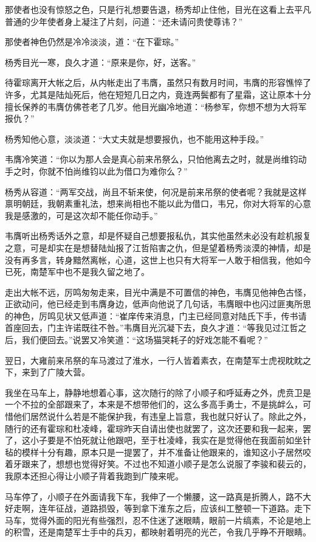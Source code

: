 那使者也没有惊怒之色，只是行礼想要告退，杨秀却止住他，目光在这看上去平凡普通的少年使者身上凝注了片刻，问道：“还未请问贵使尊讳？”

那使者神色仍然是冷冷淡淡，道：“在下霍琮。”

杨秀目光一寒，良久才道：“原来是你，好，送客。”

待霍琮离开大帐之后，从内帐走出了韦膺，虽然只有数月时间，韦膺的形容憔悴了许多，尤其是陆灿死后，他在短短几日之内，竟连两鬓都有了星霜，这让原本十分擅长保养的韦膺仿佛苍老了几岁。他目光幽冷地道：“杨参军，你想不想为大将军报仇？”

杨秀知他心意，淡淡道：“大丈夫就是想要报仇，也不能用这种手段。”

韦膺冷笑道：“你以为那人会是真心前来吊祭么，只怕他离去之时，就是尚维钧动手之时，你就不怕尚维钧以此为借口为难你么？”

杨秀从容道：“两军交战，尚且不斩来使，何况是前来吊祭的使者呢？我就是这样禀明朝廷，我朝素重礼法，想来尚相也不能以此为借口，韦兄，你对大将军的心意我是感激的，可是这次却不能任你动手。”

韦膺听出杨秀话外之意，却是怀疑自己想要报私仇，其实他虽然未必没有趁机报复之意，可是却实在是想替陆灿报了江哲陷害之仇，但是望着杨秀淡漠的神情，却是没有再多言，转身黯然离帐，心道，这世上也只有大将军一人敢于相信我，他如今已死，南楚军中也不是我久留之地了。

走出大帐不远，厉鸣匆匆走来，目光中满是不可置信的神色，韦膺见他神色古怪，正欲动问，他已经走到韦膺身边，低声向他说了几句话，韦膺眼中也闪过匪夷所思的神色，厉鸣见状又低声道：“崔庠传来消息，门主已经同意对陆氏下手，传书请首座回去，门主许诺既往不咎。”韦膺目光沉凝下去，良久才道：“等我见过江哲之后，我们便回去。”说罢又冷笑道：“这场猫哭耗子的好戏怎能不看呢？”

翌日，大雍前来吊祭的车马渡过了淮水，一行人皆着素衣，在南楚军士虎视眈眈之下，来到了广陵大营。

我坐在马车上，静静地想着心事，这次随行的除了小顺子和呼延寿之外，虎贲卫是一个不拉的全部跟来了，本来是不想带他们的，这么多高手勇士，不是挑衅么，可惜他们居然说什么若是不能保护我，有违皇上旨意，我也就只好认了。除此之外，随行的还有霍琮和杜凌峰，霍琮昨天自请出使也就罢了，这次还要和我一起来，罢了，这小子要是不怕死就让他跟吧，至于杜凌峰，我实在是觉得他在我面前如坐针毡的模样十分有趣，原本只是一提罢了，并不准备让他跟来的，谁知这小子居然咬着牙跟来了，想想也觉得好笑。不过也不知道小顺子是怎么说服了李骏和裴云的，我原本还担心得让小顺子背着我跑到广陵来呢。

马车停了，小顺子在外面请我下车，我伸了一个懒腰，这一路真是折腾人，路不大好走啊，连年征战，道路损毁，等到拿下淮东之后，应该纠工整顿一下道路。走下马车，觉得外面的阳光有些强烈，忍不住迷了迷眼睛，眼前一片缟素，不论是地上的积雪，还是南楚军士手中的兵刃，都映射着明亮的光芒，令我几乎睁不开眼睛。

